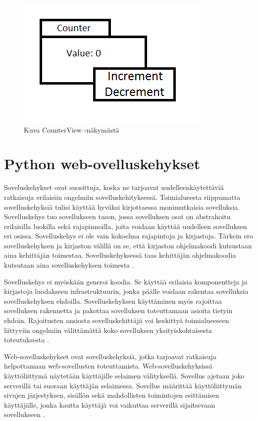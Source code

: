 \documentclass[utf8]{gradu3}
\begin{document}
\begin{figure}[h]
\centering
\includegraphics[scale=0.85]{counter.png}
\caption{Kuva CounterView -näkymästä \cite{krasner_desc}}
\end{figure}

\chapter{Python web-ovelluskehykset}
Soveluskehykset ovat suosittuja, koska ne tarjoavat uudelleenkäytettäviä ratkaisuja erilaisiin ongelmiin sovelluskehityksessä. Toimialueesta riippumatta sovelluskehyksiä tulisi käyttää hyväksi kirjottaessa monimutkaisia sovelluksia. Sovelluskehys tuo sovellukseen tason, jossa sovelluksen osat on abstrahoitu erilaisilla luokilla sekä rajapinnoilla, joita voidaan käyttää uudelleen sovelluksen eri osissa. Sovelluskehys ei ole vain kokoelma rajapintoja ja kirjastoja\parencite{towards_framework}. Tärkein ero sovelluskehyksen ja kirjaston välillä on se, että kirjaston ohjelmakoodi kutsustaan aina
kehittäjän toimestaa. Sovelluskehyksessä taas kehittäjän ohjelmakoodia kutsutaan aina sovelluskehyksen toimesta \parencite{pyramid_intr}.

Sovelluskehys ei myöskään generoi koodia. Se käyttää erilaisia komponentteja ja kirjastoja luodakseen infrastruktuurin, jonka päälle voidaan rakentaa sovelluksia sovelluskehyksen ehdoilla. Sovelluskehyksen käyttäminen myös rajoittaa sovelluksen rakennetta ja pakottaa sovelluksen toteuttamaan asioita tietyin ehdoin. Rajoitusten ansiosta sovelluskehittäjä voi keskittyä toimialueeseen liittyviin ongelmiin välittämättä koko sovelluksen yksityiskohtaisesta toteutuksesta \parencite{towards_framework}.

Web-sovelluskehykset ovat sovelluskehyksiä, jotka tarjoavat ratkaisuja helpottamaan web-sovellusten toteuttamista. Web-sovelluskehyksissä käyttöliittymä näytetään käyttäjille selaimen välityksellä. Sovellus ajetaan joko serverillä tai suoraan käyttäjän selaimessa. Sovellus määrittää käyttöliittymän sivujen järjestyksen, sisällön sekä mahdollisten toimintojen esittämisen käyttäjälle, jonka kautta käyttäjä voi vaikuttaa serverillä sijaitsevaan sovellukseen \parencite{vosloo}. 
\end{document}
